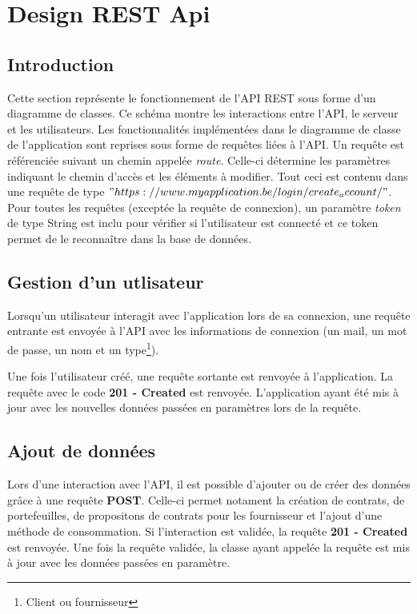 \section{Design REST Api}
\subsection{Introduction}
\begin{flushleft}
Cette section représente le fonctionnement de l'API REST sous forme d'un diagramme de classes. Ce schéma montre les interactions entre l'API, le serveur et les utilisateurs. Les fonctionnalités implémentées dans le diagramme de classe de l'application sont reprises sous forme de requêtes liées à l'API.  Un requête est référenciée suivant un chemin appelée \emph{route}. Celle-ci détermine les paramètres indiquant le chemin d'accès et les éléments à modifier. Tout ceci est contenu dans une requête de type $"https://www.myapplication.be/login/create_account/"$. Pour toutes les requêtes (exceptée la requête de connexion), un paramètre \emph{token} de type String est inclu pour vérifier si l'utilisateur est connecté et ce token permet de le reconnaître dans la base de données.
\end{flushleft}

\subsection{Gestion d'un utlisateur}
\begin{flushleft}
Lorsqu'un utilisateur interagit avec l'application lors de sa connexion, une requête entrante est envoyée à l'API avec les informations de connexion (un mail, un mot de passe, un nom et un type\footnote{Client ou fournisseur}).
\end{flushleft}

\begin{flushleft}
Une fois l'utilisateur créé, une requête sortante est renvoyée à l'application. La requête avec le code \textbf{201 - Created} est renvoyée. L'application ayant été mis à jour avec les nouvelles données passées en paramètres lors de la requête.
\end{flushleft}

\subsection{Ajout de données}
\begin{flushleft}
Lors d'une interaction avec l'API, il est possible d'ajouter ou de créer des données grâce à une requête \textbf{POST}. Celle-ci permet notament la création de contrats, de portefeuilles, de propositons de contrats pour les fournisseur et l'ajout d'une méthode de consommation. Si l'interaction est validée, la requête \textbf{201 - Created} est renvoyée. Une fois la requête validée, la classe ayant appelée la requête est mis à jour avec les données passées en paramètre.
\end{flushleft}
\newpage
